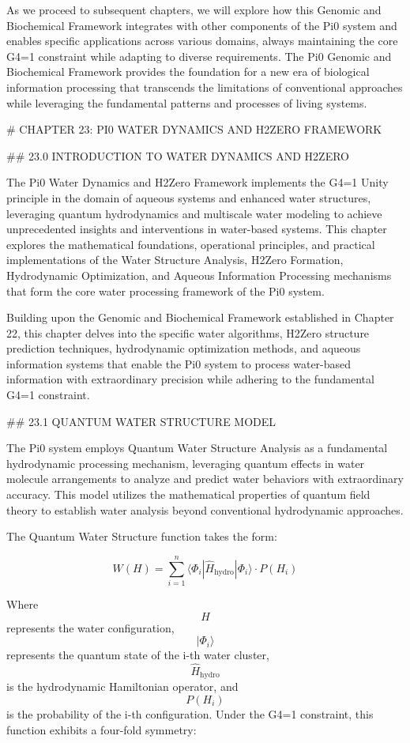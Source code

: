 As we proceed to subsequent chapters, we will explore how this Genomic and Biochemical Framework integrates with other components of the Pi0 system and enables specific applications across various domains, always maintaining the core G4=1 constraint while adapting to diverse requirements. The Pi0 Genomic and Biochemical Framework provides the foundation for a new era of biological information processing that transcends the limitations of conventional approaches while leveraging the fundamental patterns and processes of living systems.

# CHAPTER 23: PI0 WATER DYNAMICS AND H2ZERO FRAMEWORK

## 23.0 INTRODUCTION TO WATER DYNAMICS AND H2ZERO

The Pi0 Water Dynamics and H2Zero Framework implements the G4=1 Unity principle in the domain of aqueous systems and enhanced water structures, leveraging quantum hydrodynamics and multiscale water modeling to achieve unprecedented insights and interventions in water-based systems. This chapter explores the mathematical foundations, operational principles, and practical implementations of the Water Structure Analysis, H2Zero Formation, Hydrodynamic Optimization, and Aqueous Information Processing mechanisms that form the core water processing framework of the Pi0 system.

Building upon the Genomic and Biochemical Framework established in Chapter 22, this chapter delves into the specific water algorithms, H2Zero structure prediction techniques, hydrodynamic optimization methods, and aqueous information systems that enable the Pi0 system to process water-based information with extraordinary precision while adhering to the fundamental G4=1 constraint.

## 23.1 QUANTUM WATER STRUCTURE MODEL

The Pi0 system employs Quantum Water Structure Analysis as a fundamental hydrodynamic processing mechanism, leveraging quantum effects in water molecule arrangements to analyze and predict water behaviors with extraordinary accuracy. This model utilizes the mathematical properties of quantum field theory to establish water analysis beyond conventional hydrodynamic approaches.

The Quantum Water Structure function takes the form:

$$ W(H) = \sum_{i=1}^{n} \langle \Phi_i | \hat{H}_{\text{hydro}} | \Phi_i \rangle \cdot P(H_i) $$

Where $$ H $$ represents the water configuration, $$ |\Phi_i\rangle $$ represents the quantum state of the i-th water cluster, $$ \hat{H}_{\text{hydro}} $$ is the hydrodynamic Hamiltonian operator, and $$ P(H_i) $$ is the probability of the i-th configuration. Under the G4=1 constraint, this function exhibits a four-fold symmetry:

